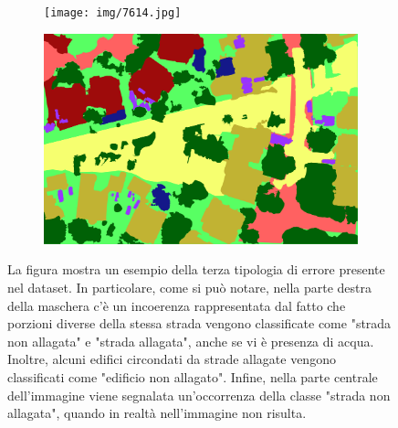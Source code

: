 \begin{itemize}
\begin{itemize}
        
        \begin{figure}[h!]
         \centering
         \begin{subfigure}[b]{0.45\textwidth}
             \centering
             \texttt{[image: img/7614.jpg]}
             \caption{}
             \label{}
         \end{subfigure}
         \hfill
         \begin{subfigure}[b]{0.45\textwidth}
             \centering
             \includegraphics[width=\textwidth]{img/7614_lab 2.png}
             \caption{}
             \label{}
         \end{subfigure}
            \caption{La figura mostra un esempio della terza tipologia di errore presente nel dataset. In particolare, come si può notare, nella parte destra della maschera c'è un incoerenza rappresentata dal fatto che porzioni diverse della stessa strada vengono classificate come "strada non allagata" e "strada allagata", anche se vi è presenza di acqua. Inoltre, alcuni edifici circondati da strade allagate vengono classificati come "edificio non allagato". Infine, nella parte centrale dell'immagine viene segnalata un'occorrenza della classe "strada non allagata", quando in realtà nell'immagine non risulta.}
            \label{fig:problem_confusion}
        \end{figure}
        
    \end{itemize}
    
\end{itemize}










